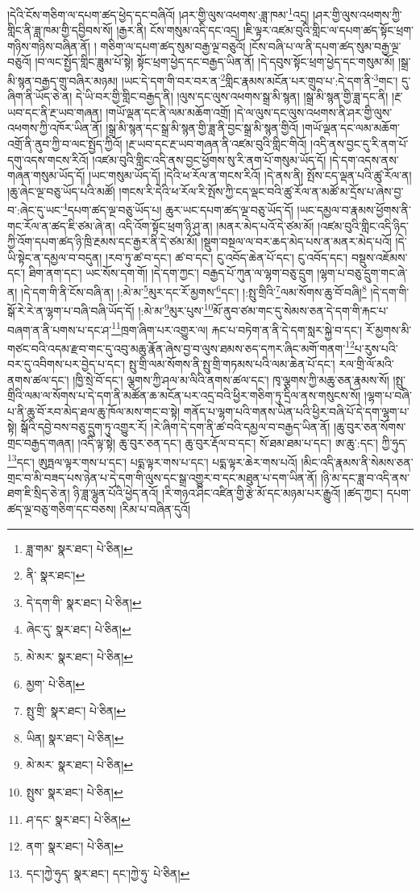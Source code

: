 །དེའི་ངོས་གཅིག་ལ་དཔག་ཚད་ཕྱེད་དང་བཞིའོ། །ཤར་གྱི་ལུས་འཕགས་:ཟླ་ཁམ་\footnote{ཟླ་གམ་  སྣར་ཐང་།  པེ་ཅིན། }འདྲ། །ཤར་གྱི་ལུས་འཕགས་ཀྱི་གླིང་ནི་ཟླ་ཁམ་གྱི་དབྱིབས་སོ། །རྒྱར་ནི། ངོས་གསུམ་འདི་དང་འདྲ། །ཇི་ལྟར་འཛམ་བུའི་གླིང་ལ་དཔག་ཚད་སྟོང་ཕྲག་གཉིས་གཉིས་བཞིན་ནོ། །
གཅིག་ལ་དཔག་ཚད་སུམ་བརྒྱ་ལྔ་བཅུའོ། །ངོས་བཞི་པ་ལ་ནི་དཔག་ཚད་སུམ་བརྒྱ་ལྔ་བཅུའོ། །བ་ལང་སྤྱོད་གླིང་ཟླུམ་པོ་སྟེ། སྟོང་ཕྲག་ཕྱེད་དང་བརྒྱད་ཡིན་ནོ། །དེ་དབུས་སྟོང་ཕྲག་ཕྱེད་དང་གསུམ་མོ། །སྒྲ་མི་སྙན་བརྒྱད་གྲུ་བཞིར་མཉམ། །ཡང་དེ་དག་གི་བར་བར་ན་\footnote{ནི་  སྣར་ཐང་། }གླིང་རྣམས་མངོན་པར་གྲུབ་པ་:དེ་དག་ནི་\footnote{དེ་དག་གི་  སྣར་ཐང་།  པེ་ཅིན། }གང་། དུ་ཞིག་ནི་ཡོད་ཅེ་ན། དེ་ཡི་བར་གྱི་གླིང་བརྒྱད་ནི། །ལུས་དང་ལུས་འཕགས་སྒྲ་མི་སྙན། །སྒྲ་མི་སྙན་གྱི་ཟླ་དང་ནི། །རྔ་ཡབ་དང་ནི་རྔ་ཡབ་གཞན། །གཡོ་ལྡན་དང་ནི་ལམ་མཆོག་འགྲོ། །དེ་ལ་ལུས་དང་ལུས་འཕགས་ནི་ཤར་གྱི་ལུས་འཕགས་ཀྱི་འཁོར་ཡིན་ནོ། །སྒྲ་མི་སྙན་དང་སྒྲ་མི་སྙན་གྱི་ཟླ་ནི་བྱང་སྒྲ་མི་སྙན་གྱིའོ། །གཡོ་ལྡན་དང་ལམ་མཆོག་འགྲོ་ནི་ནུབ་ཀྱི་བ་ལང་སྤྱོད་ཀྱིའོ། །རྔ་ཡབ་དང་རྔ་ཡབ་གཞན་ནི་འཛམ་བུའི་གླིང་གིའོ། །འདི་ནས་བྱང་དུ་རི་ནག་པོ་དགུ་འདས་གངས་རིའོ། །འཛམ་བུའི་གླིང་འདི་ནས་བྱང་ཕྱོགས་སུ་རི་ནག་པོ་གསུམ་ཡོད་དོ། །དེ་དག་འདས་ནས་གཞན་གསུམ་ཡོད་དོ། །ཡང་གསུམ་ཡོད་དོ། །དེའི་ཕ་རོལ་ན་གངས་རིའོ། །དེ་ནས་ནི། སྤོས་ངད་ལྡན་པའི་ཚུ་རོལ་ན། །ཆུ་ཞེང་ལྔ་བཅུ་ཡོད་པའི་མཚོ། །གངས་རི་དེའི་ཕ་རོལ་རི་སྤོས་ཀྱི་ངད་ལྡང་བའི་ཚུ་རོལ་ན་མཚོ་མ་དྲོས་པ་ཞེས་བྱ་བ་:ཞེང་དུ་ཡང་\footnote{ཞེང་དུ་  སྣར་ཐང་།  པེ་ཅིན། }དཔག་ཚད་ལྔ་བཅུ་ཡོད་པ། ཆུར་ཡང་དཔག་ཚད་ལྔ་བཅུ་ཡོད་དོ། །ཡང་དམྱལ་བ་རྣམས་ཕྱོགས་ནི་གང་རོལ་ན་ཚད་ཇི་ཙམ་ཞེ་ན། འདི་འོག་སྟོང་ཕྲག་ཉི་ཤུ་ན། །མནར་མེད་པའོ་དེ་ཙམ་མོ། །འཛམ་བུའི་གླིང་འདི་ཉིད་ཀྱི་འོག་དཔག་ཚད་ཉི་ཁྲི་རྔམས་དང་རྒྱར་ནི་དེ་ཙམ་མོ། །སྡུག་བསྔལ་ལ་བར་ཆད་མེད་པས་ན་མནར་མེད་པའོ། །དེ་ཡི་སྟེང་ན་དམྱལ་བ་བདུན། །རབ་ཏུ་ཚ་བ་དང་། ཚ་བ་དང་། ངུ་འབོད་ཆེན་པོ་དང་། ངུ་འབོད་དང་། བསྡུས་འཇོམས་དང་། ཐིག་ནག་དང་། ཡང་སོས་དག་གོ། །དེ་དག་ཀྱང་། བརྒྱད་པོ་ཀུན་ལ་ལྷག་བཅུ་དྲུག །ལྷག་པ་བཅུ་དྲུག་གང་ཞེ་ན། །དེ་དག་གི་ནི་ངོས་བཞི་ན། །:མེ་མ་\footnote{མེ་མར་  སྣར་ཐང་།  པེ་ཅིན། }མུར་དང་རོ་མྱགས་\footnote{མྱག་  པེ་ཅིན། }དང་། །:སྤུ་གྲིའི་\footnote{སྤུ་གྲི་  སྣར་ཐང་།  པེ་ཅིན། }ལམ་སོགས་ཆུ་བོ་བཞི།\footnote{ཡིན།  སྣར་ཐང་།  པེ་ཅིན། } །དེ་དག་གི་སྒོ་རེ་རེ་ན་ལྷག་པ་བཞི་བཞི་ཡོད་དོ། །:མེ་མ་\footnote{མེ་མར་  སྣར་ཐང་།  པེ་ཅིན། }མུར་པུས་\footnote{སྤུས་  སྣར་ཐང་།  པེ་ཅིན། }མོ་ནུབ་ཙམ་གང་དུ་སེམས་ཅན་དེ་དག་གི་རྐང་པ་བཞག་ན་ནི་པགས་པ་དང་ཤ་\footnote{ཤ་དང་  སྣར་ཐང་།  པེ་ཅིན། }ཁྲག་ཞིག་པར་འགྱུར་ལ། རྐང་པ་བཏེག་ན་ནི་དེ་དག་སླར་སྐྱེ་བ་དང་། རོ་མྱགས་མི་གཙང་བའི་འདམ་རྫབ་གང་དུ་འབུ་མཆུ་རྣོན་ཞེས་བྱ་བ་ལུས་ཐམས་ཅད་དཀར་ཞིང་མགོ་གནག་\footnote{ནག་  སྣར་ཐང་།  པེ་ཅིན། }པ་རུས་པའི་བར་དུ་འབིགས་པར་བྱེད་པ་དང་། སྤུ་གྲི་ལམ་སོགས་ནི་སྤུ་གྲི་གཏམས་པའི་ལམ་ཆེན་པོ་དང་། རལ་གྲི་ལོ་མའི་ནགས་ཚལ་དང་། །ཁྱི་སྲེ་བོ་དང་། ལྕགས་ཀྱི་ཤལ་མ་ལིའི་ནགས་ཚལ་དང་། ཁྭ་ལྕགས་ཀྱི་མཆུ་ཅན་རྣམས་སོ། །སྤུ་གྲིའི་ལམ་ལ་སོགས་པ་དེ་དག་ནི་མཚོན་ཆ་མངོན་པར་འདྲ་བའི་ཕྱིར་གཅིག་ཏུ་དྲིལ་ནས་གསུངས་སོ། །ལྷག་པ་བཞི་པ་ནི་ཆུ་བོ་རབ་མེད་ཐལ་ཆུ་ཁོལ་མས་གང་བ་སྟེ། གནོད་པ་ལྷག་པའི་གནས་ཡིན་པའི་ཕྱིར་བཞི་པོ་དེ་དག་ལྷག་པ་སྟེ། སྒོའི་དབྱེ་བས་བཅུ་དྲུག་ཏུ་འགྱུར་རོ། །རེ་ཞིག་དེ་དག་ནི་ཚ་བའི་དམྱལ་བ་བརྒྱད་ཡིན་ནོ། །ཆུ་བུར་ཅན་སོགས་གྲང་བརྒྱད་གཞན། །འདི་ལྟ་སྟེ། ཆུ་བུར་ཅན་དང་། ཆུ་བུར་རྡོལ་བ་དང་། སོ་ཐམ་ཐམ་པ་དང་། ཨ་ཆུ་:དང་། ཀྱི་ཧུད་\footnote{དང་།ཀྱེ་ཧུད་  སྣར་ཐང་། དང་།ཀྱེ་ཧུ་  པེ་ཅིན། }དང་། ཨུཏྤལ་ལྟར་གས་པ་དང་། པདྨ་ལྟར་གས་པ་དང་། པདྨ་ལྟར་ཆེར་གས་པའོ། །མིང་འདི་རྣམས་ནི་སེམས་ཅན་གྲང་བ་མི་བཟད་པས་ཉེན་པ་དེ་དག་གི་ལུས་དང་སྒྲ་འགྱུར་བ་དང་མཐུན་པ་དག་ཡིན་ནོ། །ཉི་མ་དང་ཟླ་བ་འདི་ནས་ཐག་ཇི་སྲིད་ཅེ་ན། ཉི་ཟླ་ལྷུན་པོའི་ཕྱེད་ནའོ། །རི་གཉའ་ཤིང་འཛིན་གྱི་རྩེ་མོ་དང་མཉམ་པར་རྒྱུའོ། །ཚད་ཀྱང་། དཔག་ཚད་ལྔ་བཅུ་གཅིག་དང་བཅས། །རིམ་པ་བཞིན་དུའོ། 